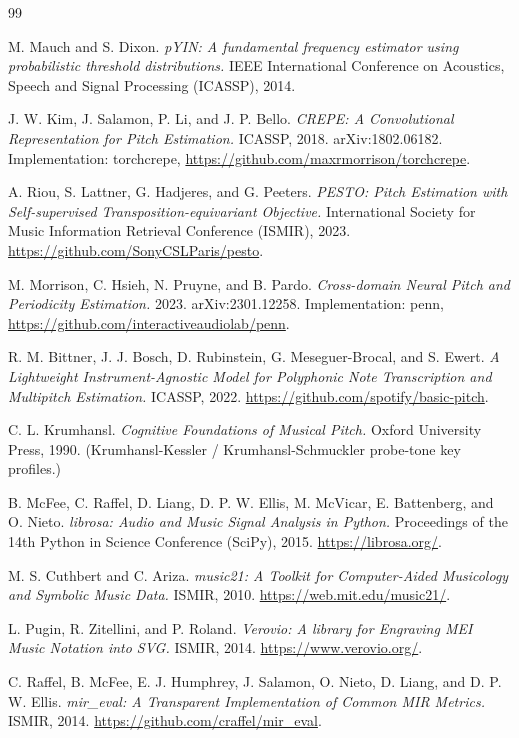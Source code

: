 \documentclass[12pt,a4paper]{article}
\begin{document}
\newpage
{}
\begin{thebibliography}{99}

 M. Mauch and S. Dixon. \emph{pYIN: A fundamental frequency
estimator using probabilistic threshold distributions.} IEEE International
Conference on Acoustics, Speech and Signal Processing (ICASSP), 2014.

 J. W. Kim, J. Salamon, P. Li, and J. P. Bello. \emph{CREPE: A
Convolutional Representation for Pitch Estimation.} ICASSP, 2018.
arXiv:1802.06182. Implementation: torchcrepe,
\url{https://github.com/maxrmorrison/torchcrepe}.

 A. Riou, S. Lattner, G. Hadjeres, and G. Peeters. \emph{PESTO:
Pitch Estimation with Self-supervised Transposition-equivariant Objective.}
International Society for Music Information Retrieval Conference (ISMIR), 2023.
\url{https://github.com/SonyCSLParis/pesto}.

 M. Morrison, C. Hsieh, N. Pruyne, and B. Pardo.
\emph{Cross-domain Neural Pitch and Periodicity Estimation.} 2023.
arXiv:2301.12258. Implementation: penn,
\url{https://github.com/interactiveaudiolab/penn}.

 R. M. Bittner, J. J. Bosch, D. Rubinstein,
G. Meseguer-Brocal, and S. Ewert. \emph{A Lightweight Instrument-Agnostic Model
for Polyphonic Note Transcription and Multipitch Estimation.} ICASSP, 2022.
\url{https://github.com/spotify/basic-pitch}.

 C. L. Krumhansl. \emph{Cognitive Foundations of Musical
Pitch.} Oxford University Press, 1990. (Krumhansl-Kessler / Krumhansl-Schmuckler
probe-tone key profiles.)

 B. McFee, C. Raffel, D. Liang, D. P. W. Ellis, M. McVicar,
E. Battenberg, and O. Nieto. \emph{librosa: Audio and Music Signal Analysis in
Python.} Proceedings of the 14th Python in Science Conference (SciPy), 2015.
\url{https://librosa.org/}.

 M. S. Cuthbert and C. Ariza. \emph{music21: A Toolkit for
Computer-Aided Musicology and Symbolic Music Data.} ISMIR, 2010.
\url{https://web.mit.edu/music21/}.

 L. Pugin, R. Zitellini, and P. Roland. \emph{Verovio: A
library for Engraving MEI Music Notation into SVG.} ISMIR, 2014.
\url{https://www.verovio.org/}.

 C. Raffel, B. McFee, E. J. Humphrey, J. Salamon, O. Nieto,
D. Liang, and D. P. W. Ellis. \emph{mir\_eval: A Transparent Implementation of
Common MIR Metrics.} ISMIR, 2014. \url{https://github.com/craffel/mir_eval}.

\end{thebibliography}
\end{document}
